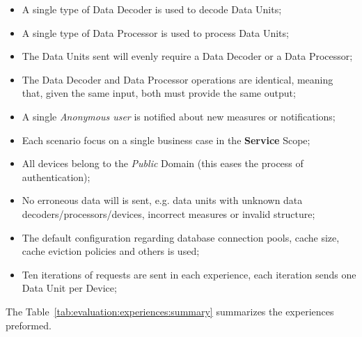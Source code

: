\begin{itemize}
    \item A single type of Data Decoder is used to decode Data Units;
    \item A single type of Data Processor is used to process Data Units;
    \item The Data Units sent will evenly require a Data Decoder or a Data Processor;
    \item The Data Decoder and Data Processor operations are identical, meaning that, given the same input, both must provide the same output;  
    \item A single \textit{Anonymous user} is notified about new measures or notifications;
    \item Each scenario focus on a single business case in the \textbf{Service} Scope;
    \item All devices belong to the \textit{Public} Domain (this eases the process of authentication);
    \item No erroneous data will is sent, e.g. data units with unknown data decoders/processors/devices, incorrect measures or invalid structure;
    \item The default configuration regarding database connection pools, cache size, cache eviction policies and others is used;
    \item Ten iterations of requests are sent in each experience, each iteration sends one Data Unit per Device;
\end{itemize}

The Table~\ref{tab:evaluation:experiences:summary} summarizes the experiences preformed.

